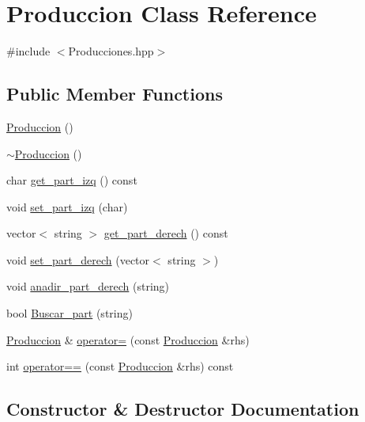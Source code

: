 \hypertarget{class_produccion}{}\section{Produccion Class Reference}
\label{class_produccion}


{\ttfamily \#include $<$Producciones.\+hpp$>$}

\subsection*{Public Member Functions}
\begin{DoxyCompactItemize}
\item 
\hyperlink{class_produccion_a51dbc93906de019376c33f7165196623}{Produccion} ()
\item 
\hyperlink{class_produccion_a13c3ee25145a810dd61fc636e26f5b7d}{$\sim$\+Produccion} ()
\item 
char \hyperlink{class_produccion_ac863aa129550b93bf54b8c6489b432fe}{get\+\_\+part\+\_\+izq} () const
\item 
void \hyperlink{class_produccion_a9bb0be1c947951dd47a2527ada53defc}{set\+\_\+part\+\_\+izq} (char)
\item 
vector$<$ string $>$ \hyperlink{class_produccion_a9e1c08ed736e97288f8bf78286498f57}{get\+\_\+part\+\_\+derech} () const
\item 
void \hyperlink{class_produccion_a6beb2102ee62db2f0e5181c17efa2a6c}{set\+\_\+part\+\_\+derech} (vector$<$ string $>$)
\item 
void \hyperlink{class_produccion_a03c832739efee38f117d6b33e3c11c54}{anadir\+\_\+part\+\_\+derech} (string)
\item 
bool \hyperlink{class_produccion_a2192f45a1caead0e79d9a043cf22bc10}{Buscar\+\_\+part} (string)
\item 
\hyperlink{class_produccion}{Produccion} \& \hyperlink{class_produccion_a31a114a57efbe80598cdfc5b739ed3b4}{operator=} (const \hyperlink{class_produccion}{Produccion} \&rhs)
\item 
int \hyperlink{class_produccion_a42b1202a9a4904c19d6af60be18936cd}{operator==} (const \hyperlink{class_produccion}{Produccion} \&rhs) const
\end{DoxyCompactItemize}


\subsection{Constructor \& Destructor Documentation}
\mbox{\label{class_produccion_a51dbc93906de019376c33f7165196623}} 
